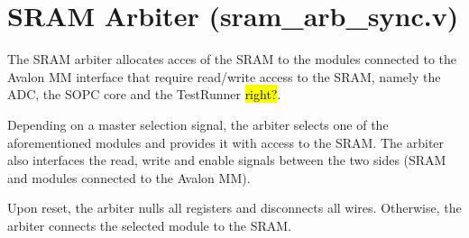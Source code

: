 \section{SRAM Arbiter (sram\_arb\_sync.v)}

The SRAM arbiter allocates acces of the SRAM to the modules connected to the Avalon MM interface that require read/write access to the SRAM, namely the ADC, the SOPC core and the TestRunner \hl{right?}.

Depending on a master selection signal, the arbiter selects one of the aforementioned modules and provides it with access to the SRAM. The arbiter also interfaces the read, write and enable signals between the two sides (SRAM and modules connected to the Avalon MM).

Upon reset, the arbiter nulls all registers and disconnects all wires. Otherwise, the arbiter connects the selected module to the SRAM.